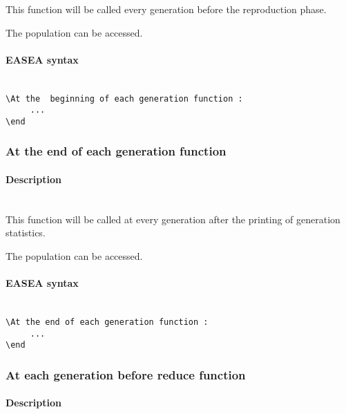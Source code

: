 \documentclass{book}
\begin{document}
This function will be called every generation before the reproduction
phase.

The population can be accessed.

\paragraph{EASEA syntax}\label{easea-syntax-6}
~\\

\texttt{\textbackslash{}At~the~~beginning~of~each~generation~function~:}\\\texttt{~~~~~...}\\\texttt{\textbackslash{}end}

\subsubsection{At the end of each generation
function}\label{at-the-end-of-each-generation-function}

\paragraph{Description}\label{description-7}
~\\

This function will be called at every generation after the printing of
generation statistics.

The population can be accessed.

\paragraph{EASEA syntax}\label{easea-syntax-7}
~\\

\texttt{\textbackslash{}At~the~end~of~each~generation~function~:}\\\texttt{~~~~~...}\\\texttt{\textbackslash{}end}

\subsubsection{At each generation before reduce
function}\label{at-each-generation-before-reduce-function}

\paragraph{Description}\label{description-8}
~\\
\end{document}
